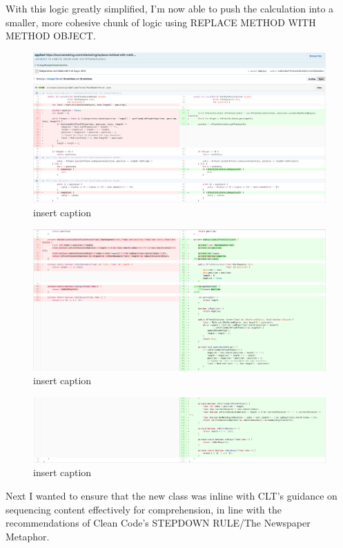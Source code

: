 With this logic greatly simplified, I’m now able to push the calculation into a smaller, more cohesive chunk of logic using REPLACE METHOD WITH METHOD OBJECT.

\begin{figure}[H]
	\centering
	\includegraphics[width=\linewidth]{code18}
	\caption{insert caption}
\end{figure}
\begin{figure}[H]
	\centering
	\includegraphics[width=\linewidth]{code19}
	\caption{insert caption}
\end{figure}
\begin{figure}[H]
	\centering
	\includegraphics[width=\linewidth]{code20}
	\caption{insert caption}
\end{figure}
Next I wanted to ensure that the new class was inline with CLT’s guidance on sequencing content effectively for comprehension, in line with the recommendations of Clean Code’s STEPDOWN RULE/The Newspaper Metaphor.

